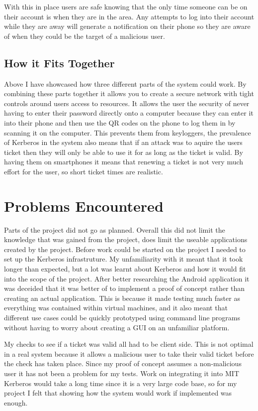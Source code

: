 \documentclass[]{report}   %
\begin{document}
With this in place users are safe knowing that the only time someone can be on their account is when they are in the area. Any attempts to log into their account while they are away will generate a notification on their phone so they are aware of when they could be the target of a malicious user.

\subsection{How it Fits Together}
Above I have showcased how three different parts of the system could work. By combining these parts together it allows you to create a secure network with tight controls around users access to resources. It allows the user the security of never having to enter their password directly onto a computer because they can enter it into their phone and then use the QR codes on the phone to log them in by scanning it on the computer. This prevents them from keyloggers, the prevalence of Kerberos in the system also means that if an attack was to aquire the users ticket then they will only be able to use it for as long as the ticket is valid. By having them on smartphones it means that renewing a ticket is not very much effort for the user, so short ticket times are realistic.



\section{Problems Encountered}
Parts of the project did not go as planned. Overall this did not limit the knowledge that was gained from the project, does limit the useable applications created by the project. Before work could be started on the project I needed to set up the Kerberos infrastruture. My unfamiliarity with it meant that it took longer than expected, but a lot was learnt about Kerberos and how it would fit into the scope of the project. After better researching the Android application it was deceided that it was better of to implement a proof of concept rather than creating an actual application. This is because it made testing much faster as everything was contained within virtual machines, and it also meant that different use cases could be quickly prototyped using command line programs without having to worry about creating a GUI on an unfamiliar platform.

My checks to see if a ticket was valid all had to be client side. This is not optimal in a real system because it allows a malicious user to take their valid ticket before the check has taken place. Since my proof of concept assumes a non-malicious user it has not been a problem for my tests. Work on integrating it into MIT Kerberos would take a long time since it is a very large code base, so for my project I felt that showing how the system would work if implemented was enough.




\end{document}
